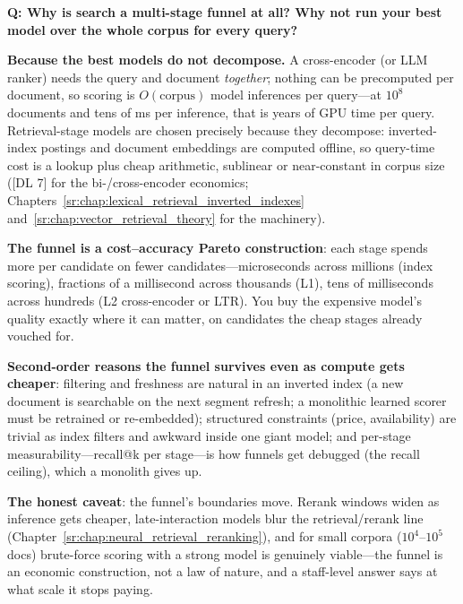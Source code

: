\begin{interviewq}
\textbf{Q: Why is search a multi-stage funnel at all? Why not run your best model over the whole corpus for every query?}

 \quad {} \quad \badgefreq{\freqmed}

\stronganswer

\textbf{Because the best models do not decompose.} A cross-encoder (or LLM ranker) needs the query and document \textit{together}; nothing can be precomputed per document, so scoring is $O(\text{corpus})$ model inferences per query---at $10^8$ documents and tens of ms per inference, that is years of GPU time per query. Retrieval-stage models are chosen precisely because they decompose: inverted-index postings and document embeddings are computed offline, so query-time cost is a lookup plus cheap arithmetic, sublinear or near-constant in corpus size ([DL 7] for the bi-/cross-encoder economics; Chapters~\ref{sr:chap:lexical_retrieval_inverted_indexes} and~\ref{sr:chap:vector_retrieval_theory} for the machinery).

\textbf{The funnel is a cost--accuracy Pareto construction}: each stage spends more per candidate on fewer candidates---microseconds across millions (index scoring), fractions of a millisecond across thousands (L1), tens of milliseconds across hundreds (L2 cross-encoder or LTR). You buy the expensive model's quality exactly where it can matter, on candidates the cheap stages already vouched for.

\textbf{Second-order reasons the funnel survives even as compute gets cheaper}: filtering and freshness are natural in an inverted index (a new document is searchable on the next segment refresh; a monolithic learned scorer must be retrained or re-embedded); structured constraints (price, availability) are trivial as index filters and awkward inside one giant model; and per-stage measurability---recall@k per stage---is how funnels get debugged (the recall ceiling), which a monolith gives up.

\textbf{The honest caveat}: the funnel's boundaries move. Rerank windows widen as inference gets cheaper, late-interaction models blur the retrieval/rerank line (Chapter~\ref{sr:chap:neural_retrieval_reranking}), and for small corpora ($10^4$--$10^5$ docs) brute-force scoring with a strong model is genuinely viable---the funnel is an economic construction, not a law of nature, and a staff-level answer says at what scale it stops paying.


\end{interviewq}
